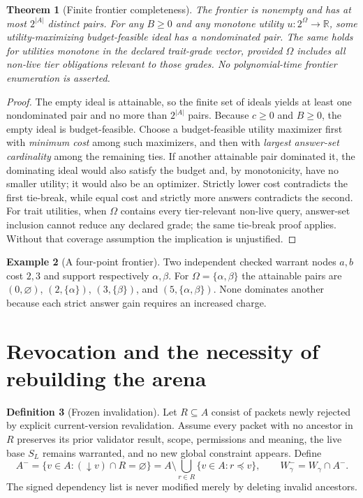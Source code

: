 \documentclass[10pt,letterpaper]{article}
\newtheorem{theorem}{Theorem}[section]
\theoremstyle{definition}
\newtheorem{definition}[theorem]{Definition}
\newtheorem{example}[theorem]{Example}
\theoremstyle{remark}
\begin{document}
\begin{theorem}[Finite frontier completeness]\label{thm:frontier}
The frontier is nonempty and has at most $2^{|A|}$ distinct pairs. For any $B\ge0$ and any monotone utility $u:2^\Omega\to\mathbb R$, some utility-maximizing budget-feasible ideal has a nondominated pair. The same holds for utilities monotone in the declared trait-grade vector, provided $\Omega$ includes all non-live tier obligations relevant to those grades. No polynomial-time frontier enumeration is asserted.
\end{theorem}
\begin{proof}
The empty ideal is attainable, so the finite set of ideals yields at least one nondominated pair and no more than $2^{|A|}$ pairs. Because $c\ge0$ and $B\ge0$, the empty ideal is budget-feasible. Choose a budget-feasible utility maximizer first with \emph{minimum cost} among such maximizers, and then with \emph{largest answer-set cardinality} among the remaining ties. If another attainable pair dominated it, the dominating ideal would also satisfy the budget and, by monotonicity, have no smaller utility; it would also be an optimizer. Strictly lower cost contradicts the first tie-break, while equal cost and strictly more answers contradicts the second. For trait utilities, when $\Omega$ contains every tier-relevant non-live query, answer-set inclusion cannot reduce any declared grade; the same tie-break proof applies. Without that coverage assumption the implication is unjustified.\end{proof}

\begin{example}[A four-point frontier]
Two independent checked warrant nodes $a,b$ cost $2,3$ and support respectively $\alpha,\beta$. For $\Omega=\{\alpha,\beta\}$ the attainable pairs are $(0,\varnothing)$, $(2,\{\alpha\})$, $(3,\{\beta\})$, and $(5,\{\alpha,\beta\})$. None dominates another because each strict answer gain requires an increased charge.
\end{example}

\section{Revocation and the necessity of rebuilding the arena}\label{gl-first-W2-s9}
\begin{definition}[Frozen invalidation]
Let $R\subseteq A$ consist of packets newly rejected by explicit current-version revalidation. Assume every packet with no ancestor in $R$ preserves its prior validator result, scope, permissions and meaning, the live base $S_L$ remains warranted, and no new global constraint appears. Define
\begin{equation}\label{eq:survive}
A^-=\{v\in A:(\downarrow v)\cap R=\varnothing\}
=A\setminus\bigcup_{r\in R}\{v\in A:r\preceq v\},\qquad W^-_\gamma=W_\gamma\cap A^-.
\end{equation}
The signed dependency list is never modified merely by deleting invalid ancestors.
\end{definition}
\end{document}
